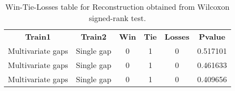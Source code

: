 \begin{table}
\centering
\caption{Win-Tie-Losses table for Reconstruction obtained from Wilcoxon signed-rank test.}
\label{tab:reconstruction_training_data_comparison}
\begin{tabular}{|c|c|c|c|c|c|}
\toprule
   \textbf{Train1} & \textbf{Train2} &  \textbf{Win} &  \textbf{Tie} &  \textbf{Losses} &  \textbf{Pvalue} \\
 Multivariate gaps &      Single gap &             0 &             1 &                0 &         0.517101 \\
\midrule
 Multivariate gaps &      Single gap &             0 &             1 &                0 &         0.461633 \\
 Multivariate gaps &      Single gap &             0 &             1 &                0 &         0.409656 \\
\bottomrule
\end{tabular}
\end{table}
